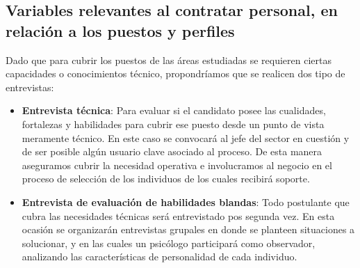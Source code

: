 \newpage

    \subsection{Variables relevantes al contratar personal, en relación a los puestos y perfiles}%
  
    
    Dado que para cubrir los puestos de las áreas estudiadas se requieren ciertas capacidades o conocimientos técnico, propondríamos que se realicen dos tipo de entrevistas:
    \begin{itemize}
	    \item \textbf{Entrevista técnica}: Para evaluar si el candidato posee las cualidades, fortalezas y habilidades para cubrir ese puesto desde un punto de vista meramente técnico. En este caso se convocará al jefe del sector en cuestión y de ser posible algún usuario clave asociado al proceso. De esta manera aseguramos cubrir la necesidad operativa e involucramos al negocio en el proceso de selección de los individuos de los cuales recibirá soporte.
        \item \textbf{Entrevista de evaluación de habilidades blandas}: Todo postulante que cubra las necesidades técnicas será entrevistado pos segunda vez. En esta ocasión se organizarán entrevistas grupales en donde se planteen situaciones a solucionar, y en las cuales un psicólogo participará como observador, analizando las características de personalidad de cada individuo.
           \end{itemize}


